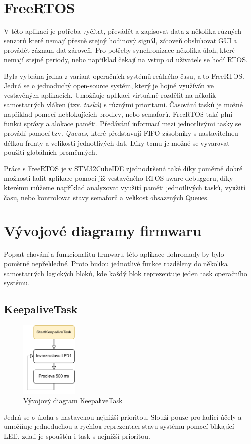 \section{FreeRTOS}
V této aplikaci je potřeba vyčítat, převádět a zapisovat data z několika různých senzorů které nemají přesně stejný hodinový signál, zároveň obsluhovat \ac{GUI} a provádět záznam dat zároveň. Pro potřeby synchronizace několika úloh, které nemají stejné periody, nebo například čekají na vstup od uživatele se hodí \ac{RTOS}.

Byla vybrána jedna z variant operačních systémů reálného času, a to FreeRTOS. Jedná se o jednoduchý open-source systém, který je hojně využíván ve vestavěných aplikacích. Umožňuje aplikaci virtuálně rozdělit na několik samostatných vláken (tzv. \emph{tasků}) s různými prioritami. Časování tasků je možné například pomocí neblokujících prodlev, nebo semaforů. FreeRTOS také plní funkci správy a alokace paměti. Předávání informací mezi jednotlivými tasky se provádí pomocí tzv. \emph{Queues}, které představují \ac{FIFO} zásobníky s nastavitelnou délkou fronty a velikosti jednotlivých dat. Díky tomu je možné se vyvarovat použití globálních proměnných. \cite{Zhu2011}

Práce s FreeRTOS je v STM32CubeIDE zjednodušená také díky poměrně dobré možnosti ladit aplikace pomocí již vestavěného RTOS-aware debuggeru, díky kterému můžeme například analyzovat využití paměti jednotlivých tasků, využití času, nebo kontrolovat stavy semaforů a velikost obsazených Queues. 

\section{Vývojové diagramy firmwaru}
Popsat chování a funkcionalitu firmwaru této aplikace dohromady by bylo poměrně nepřehledné. Proto budou jednotlivé funkce rozděleny do několika samostatných logických bloků, kde každý blok reprezentuje jeden task operačního systému.

\subsection{KeepaliveTask}
\begin{figure}[h]
    \centering
    \includegraphics[width=0.25\textwidth]{obrazky/KeepaliveTask}
    \caption{Vývojový diagram KeepaliveTask}
\end{figure}
Jedná se o úlohu s nastavenou nejnižší prioritou. Slouží pouze pro ladicí účely a umožňuje jednoduchou a rychlou reprezentaci stavu systému pomocí blikající LED, zdali je spouštěn i task s nejnižší prioritou.
